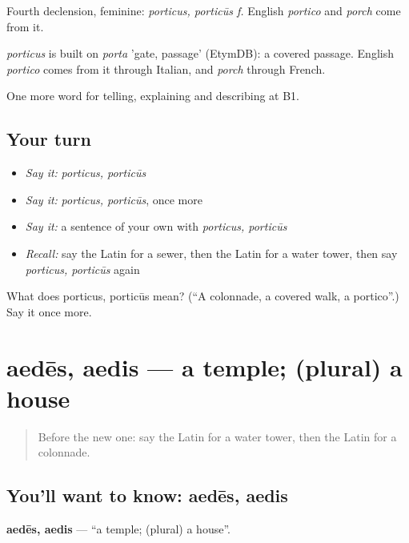 Fourth declension, feminine: \emph{porticus, porticūs f.} English \emph{portico} and \emph{porch} come from it.

\begin{cousinweb}
\emph{porticus} is built on \emph{porta} 'gate, passage' (EtymDB): a covered passage. English \emph{portico} comes from it through Italian, and \emph{porch} through French.
\end{cousinweb}

\begin{grammarlens}[title={What you've built}]
One more word for telling, explaining and describing at B1.
\end{grammarlens}

\subsection*{Your turn}
\begin{itemize}
\raggedright
  \item \emph{Say it:} \emph{porticus, porticūs}
  \item \emph{Say it:} \emph{porticus, porticūs}, once more
  \item \emph{Say it:} a sentence of your own with \emph{porticus, porticūs}
  \item \emph{Recall:} say the Latin for a sewer, then the Latin for a water tower, then say \emph{porticus, porticūs} again
\end{itemize}

\begin{tcolorbox}[breakable,colback=teal!4,colframe=teal!35!black,title={Before you move on}]
What does porticus, porticūs mean? (\textquotedblleft{}A colonnade, a covered walk, a portico\textquotedblright{}.) Say it once more.
\end{tcolorbox}
\section[aedēs, aedis]{aedēs, aedis — a temple; (plural) a house}

\label{lesson:LA-C459-aedes}



\begin{quote}
Before the new one: say the Latin for a water tower, then the Latin for a colonnade.
\end{quote}

\subsection*{You'll want to know: aedēs, aedis}
\textbf{aedēs, aedis} — \textquotedblleft{}a temple; (plural) a house\textquotedblright{}.

